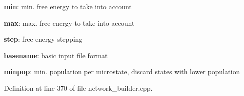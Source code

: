 \begin{DoxyItemize}
\item {\bfseries min}\-: min. free energy to take into account
\item {\bfseries max}\-: max. free energy to take into account
\item {\bfseries step}\-: free energy stepping
\item {\bfseries basename}\-: basic input file format
\item {\bfseries minpop}\-: min. population per microstate, discard states with lower population 
\end{DoxyItemize}

Definition at line 370 of file network\-\_\-builder.\-cpp.

